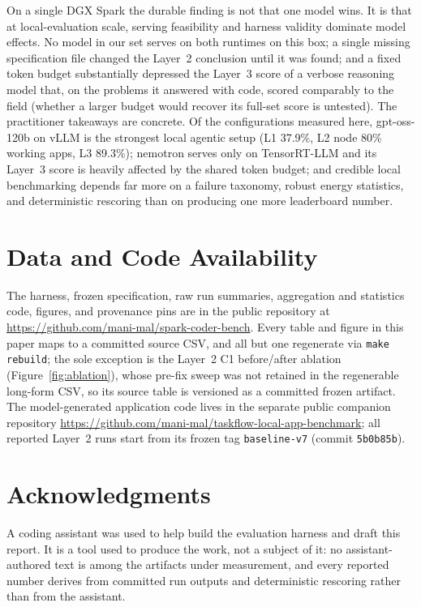 \documentclass[10pt,twocolumn]{article}
\newcommand{\code}[1]{\texttt{\small #1}}
\begin{document}
On a single DGX Spark the durable finding is not that one model wins. It is that at
local-evaluation scale, serving feasibility and harness validity dominate model effects. No model
in our set serves on both runtimes on this box; a single missing specification file changed the
Layer~2 conclusion until it was found; and a fixed token budget substantially depressed the
Layer~3 score of a verbose reasoning model that, on the problems it answered with code, scored
comparably to the field (whether a larger budget would recover its full-set score is untested).
The practitioner takeaways are concrete. Of the configurations measured here, gpt-oss-120b on
vLLM is the strongest local agentic setup (L1 37.9\%, L2 node 80\% working apps, L3 89.3\%);
nemotron serves only on TensorRT-LLM and its Layer~3 score is heavily affected by the shared
token budget; and credible local benchmarking depends far more on a failure taxonomy, robust
energy statistics, and deterministic rescoring than on producing one more leaderboard number.

\section*{Data and Code Availability}

The harness, frozen specification, raw run summaries, aggregation and statistics code, figures,
and provenance pins are in the public repository at
\url{https://github.com/mani-mal/spark-coder-bench}. Every table and figure in
this paper maps to a committed source CSV, and all but one regenerate via \code{make rebuild};
the sole exception is the Layer~2 C1 before/after ablation (Figure~\ref{fig:ablation}), whose
pre-fix sweep was not retained in the regenerable long-form CSV, so its source table is
versioned as a committed frozen artifact. The
model-generated application code lives in the separate public companion repository
\url{https://github.com/mani-mal/taskflow-local-app-benchmark}; all reported Layer~2 runs start
from its frozen tag \code{baseline-v7} (commit \code{5b0b85b}).

\section*{Acknowledgments}

A coding assistant was used to help build the evaluation harness and draft this report. It is a
tool used to produce the work, not a subject of it: no assistant-authored text is among the
artifacts under measurement, and every reported number derives from committed run outputs and
deterministic rescoring rather than from the assistant.
\end{document}
